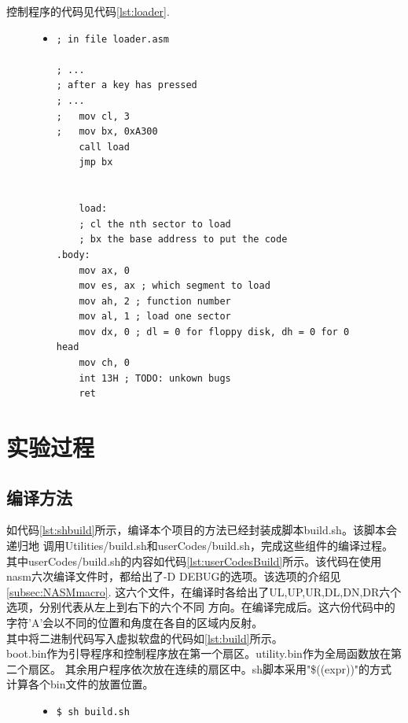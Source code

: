 \documentclass[a4paper]{article}
\begin{document}
    控制程序的代码见代码\ref{lst:loader}.

    \begin{figure}
    \begin{itemize}
    \item[] \begin{lstlisting}[language={[x86masm]Assembler}, label=lst:loader, caption=控制程序中的扇区载入部分]
; in file loader.asm

; ...
; after a key has pressed
; ...
;   mov cl, 3
;   mov bx, 0xA300
    call load
    jmp bx


    load:
    ; cl the nth sector to load
    ; bx the base address to put the code
.body:
    mov ax, 0
    mov es, ax ; which segment to load
    mov ah, 2 ; function number
    mov al, 1 ; load one sector
    mov dx, 0 ; dl = 0 for floppy disk, dh = 0 for 0 head
    mov ch, 0 
    int 13H ; TODO: unkown bugs
    ret 
    \end{lstlisting}
    \end{itemize}
    \end{figure}

\section{实验过程}
    \subsection{编译方法}
    如代码\ref{lst:shbuild}所示，编译本个项目的方法已经封装成脚本build.sh。该脚本会递归地
    调用Utilities/build.sh和userCodes/build.sh，完成这些组件的编译过程。\\ 

    其中userCodes/build.sh的内容如代码\ref{lst:userCodesBuild}所示。该代码在使用
    nasm六次编译文件时，都给出了-D DEBUG的选项。该选项的介绍见\ref{subsec:NASMmacro}.
    这六个文件，在编译时各给出了UL,UP,UR,DL,DN,DR六个选项，分别代表从左上到右下的六个不同
    方向。在编译完成后。这六份代码中的字符'A'会以不同的位置和角度在各自的区域内反射。\\ 

    其中将二进制代码写入虚拟软盘的代码如\ref{lst:build}所示。\\
    boot.bin作为引导程序和控制程序放在第一个扇区。utility.bin作为全局函数放在第二个扇区。
    其余用户程序依次放在连续的扇区中。sh脚本采用"\$((expr))"的方式计算各个bin文件的放置位置。

    \begin{figure}
    \begin{itemize}
    \item[] \begin{lstlisting}[language=sh, label=lst:shbuild, caption=编译程序代码的方法]
$ sh build.sh
    \end{lstlisting}
    \end{itemize}
    \end{figure}
\end{document}
